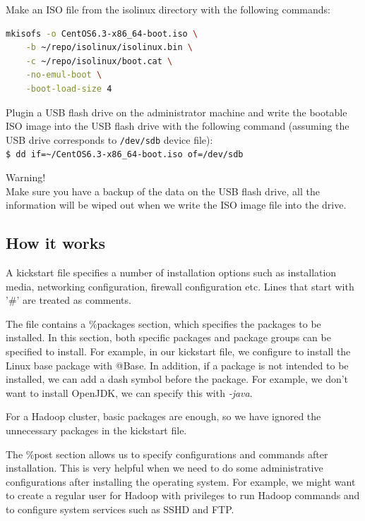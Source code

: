 Make an ISO file from the isolinux directory with the following commands:
\lstset{style=bashstyle}
\begin{lstlisting}[language=bash]
mkisofs -o CentOS6.3-x86_64-boot.iso \
    -b ~/repo/isolinux/isolinux.bin \
    -c ~/repo/isolinux/boot.cat \
    -no-emul-boot \
    -boot-load-size 4
\end{lstlisting}

Plugin a USB flash drive on the administrator machine and write the bootable ISO image into the USB flash drive with the following command (assuming the USB drive corresponds to \verb|/dev/sdb| device file): \\
\verb|$ dd if=~/CentOS6.3-x86_64-boot.iso of=/dev/sdb|

\begin{warning}
Warning! \\
Make sure you have a backup of the data on the USB flash drive, all the information will be wiped out when we write the ISO image file into the drive.
\end{warning}

\subsection*{How it works}
A kickstart file\index{kickstart file} specifies a number of installation options such as installation media, networking configuration, firewall configuration etc. Lines that start with '\#' are treated as comments.

The file contains a \%packages section, which specifies the packages to be installed. In this section, both specific packages and package groups can be specified to install. For example, in our kickstart file, we configure to install the Linux base package with @Base. In addition, if a package is not intended to be installed, we can add a dash symbol before the package. For example, we don't want to install OpenJDK, we can specify this with \emph{-java}.

For a Hadoop cluster, basic packages are enough, so we have ignored the unnecessary packages in the kickstart file.

The \%post section allows us to specify configurations and commands after installation. This is very helpful when we need to do some administrative configurations after installing the operating system. For example, we might want to create a regular user for Hadoop with privileges to run Hadoop commands and to configure system services such as SSHD and FTP.

